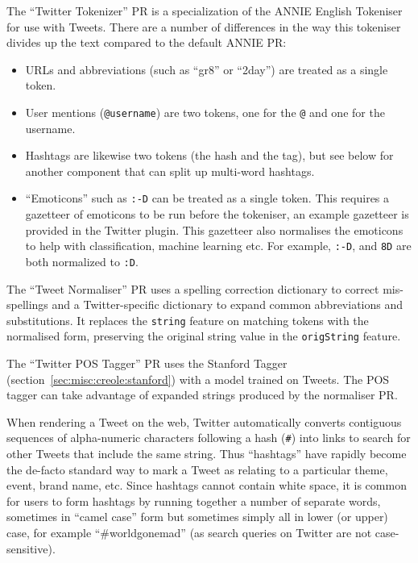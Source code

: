 The ``Twitter Tokenizer'' PR is a specialization of the ANNIE English Tokeniser
for use with Tweets.  There are a number of differences in the way this
tokeniser divides up the text compared to the default ANNIE PR:
%
\begin{itemize}
\item URLs and abbreviations (such as ``gr8'' or ``2day'') are treated as a
  single token.
\item User mentions (\verb!@username!) are two tokens, one for the \verb!@! and
  one for the username.
\item Hashtags are likewise two tokens (the hash and the tag), but see below
  for another component that can split up multi-word hashtags.
\item ``Emoticons'' such as \verb!:-D! can be treated as a single token.  This
  requires a gazetteer of emoticons to be run before the tokeniser, an example
  gazetteer is provided in the Twitter plugin. This gazetteer also normalises
  the emoticons to help with classification, machine learning etc. For example,
  \verb!:-D!, and \verb!8D! are both normalized to \verb!:D!.
\end{itemize}

The ``Tweet Normaliser'' PR uses a spelling correction dictionary to correct
mis-spellings and a Twitter-specific dictionary to expand common abbreviations
and substitutions.  It replaces the \verb!string! feature on matching tokens
with the normalised form, preserving the original string value in the
\verb!origString! feature.

The ``Twitter POS Tagger'' PR uses the Stanford Tagger
(section~\ref{sec:misc:creole:stanford}) with a model trained on Tweets.  The
POS tagger can take advantage of expanded strings produced by the normaliser
PR.


When rendering a Tweet on the web, Twitter automatically converts contiguous
sequences of alpha-numeric characters following a hash (\verb!#!) into links
to search for other Tweets that include the same string.  Thus ``hashtags''
have rapidly become the de-facto standard way to mark a Tweet as relating to a
particular theme, event, brand name, etc.  Since hashtags cannot contain white
space, it is common for users to form hashtags by running together a number of
separate words, sometimes in ``camel case'' form but sometimes simply all in
lower (or upper) case, for example ``\#worldgonemad'' (as search queries on
Twitter are not case-sensitive).

